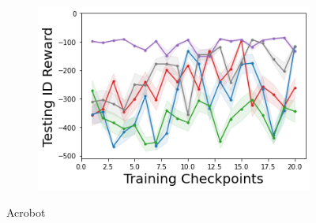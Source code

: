 \begin{figure}
\begin{subfigure}{.3\textwidth}
    \end{subfigure}
    \begin{subfigure}{.3\textwidth}
        \includegraphics[width=\textwidth]{sections/011_icml2022/resources/Acrobot-v1-mean_reward_-testing-model+.png}
    \end{subfigure}
        \vspace{-3mm}
    \caption*{Acrobot}
    \vspace{2mm}


\end{figure}
